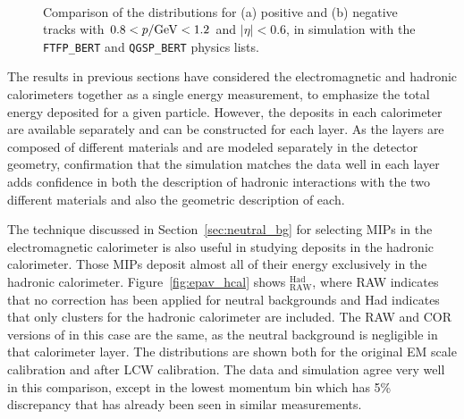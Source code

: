 \begin{figure}[ht]
\centering
{}
~
\caption{ Comparison of the \ep distributions for (a) positive and (b) negative tracks with $0.8< p/\mathrm{Ge\kern -0.05em V}<1.2$ and $|\eta|<0.6$, in simulation with the \texttt{FTFP\_BERT} and \texttt{QGSP\_BERT} physics lists.}
\label{fig:eoverp_charge}
\end{figure}

The \epav results in previous sections have considered the electromagnetic and hadronic calorimeters together as a single energy measurement, to emphasize the total energy deposited for a given particle. 
However, the deposits in each calorimeter are available separately and \epav can be constructed for each layer. 
As the layers are composed of different materials and are modeled separately in the detector geometry, confirmation that the simulation matches the data well in each layer adds confidence in both the description of hadronic interactions with the two different materials and also the geometric description of each. 

The technique discussed in Section~\ref{sec:neutral_bg} for selecting \ac{MIP}s in the electromagnetic calorimeter is also useful in studying deposits in the hadronic calorimeter.
Those \ac{MIP}s deposit almost all of their energy exclusively in the hadronic calorimeter.
Figure~\ref{fig:epav_hcal} shows \epav$_\mathrm{RAW}^\mathrm{Had}$, where RAW indicates that no correction has been applied for neutral backgrounds and Had indicates that only clusters for the hadronic calorimeter are included.
The RAW and COR versions of \epav in this case are the same, as the neutral background is negligible in that calorimeter layer.
The distributions are shown both for the original EM scale calibration and after LCW calibration.
The data and simulation agree very well in this comparison, except in the lowest momentum bin which has 5\% discrepancy that has already been seen in similar measurements.

